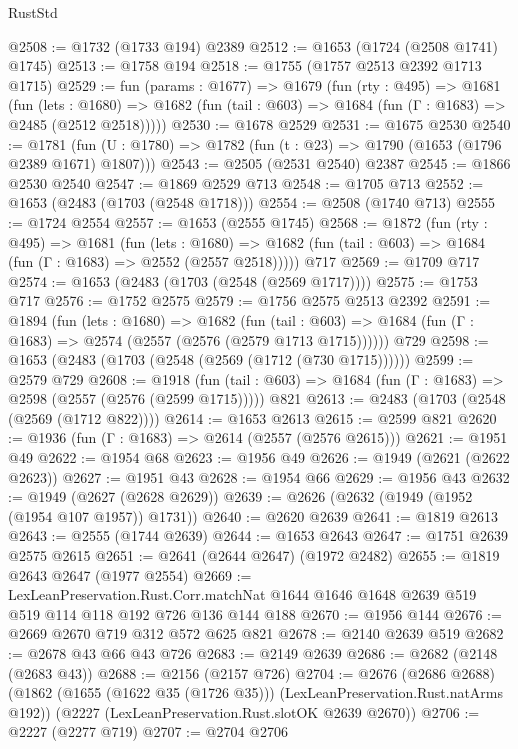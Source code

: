 \begin{lexlean}{RustStd}
\begin{coremodule}
@2508 := @1732 (@1733 @194) @2389
@2512 := @1653 (@1724 (@2508 @1741) @1745)
@2513 := @1758 @194
@2518 := @1755 (@1757 @2513 @2392 @1713 @1715)
@2529 := fun (params : @1677) =>
  @1679
    (fun (rty : @495) =>
    @1681
      (fun (lets : @1680) =>
      @1682 (fun (tail : @603) => @1684 (fun (Γ : @1683) => @2485 (@2512 @2518)))))
@2530 := @1678 @2529
@2531 := @1675 @2530
@2540 := @1781 (fun (U : @1780) => @1782 (fun (t : @23) => @1790 (@1653 (@1796 @2389 @1671) @1807)))
@2543 := @2505 (@2531 @2540) @2387
@2545 := @1866 @2530 @2540
@2547 := @1869 @2529 @713
@2548 := @1705 @713
@2552 := @1653 (@2483 (@1703 (@2548 @1718)))
@2554 := @2508 (@1740 @713)
@2555 := @1724 @2554
@2557 := @1653 (@2555 @1745)
@2568 := @1872
    (fun (rty : @495) =>
    @1681
      (fun (lets : @1680) =>
      @1682 (fun (tail : @603) => @1684 (fun (Γ : @1683) => @2552 (@2557 @2518)))))
    @717
@2569 := @1709 @717
@2574 := @1653 (@2483 (@1703 (@2548 (@2569 @1717))))
@2575 := @1753 @717
@2576 := @1752 @2575
@2579 := @1756 @2575 @2513 @2392
@2591 := @1894
    (fun (lets : @1680) =>
    @1682
      (fun (tail : @603) => @1684 (fun (Γ : @1683) => @2574 (@2557 (@2576 (@2579 @1713 @1715))))))
    @729
@2598 := @1653 (@2483 (@1703 (@2548 (@2569 (@1712 (@730 @1715))))))
@2599 := @2579 @729
@2608 := @1918
    (fun (tail : @603) => @1684 (fun (Γ : @1683) => @2598 (@2557 (@2576 (@2599 @1715)))))
    @821
@2613 := @2483 (@1703 (@2548 (@2569 (@1712 @822))))
@2614 := @1653 @2613
@2615 := @2599 @821
@2620 := @1936 (fun (Γ : @1683) => @2614 (@2557 (@2576 @2615)))
@2621 := @1951 @49
@2622 := @1954 @68
@2623 := @1956 @49
@2626 := @1949 (@2621 (@2622 @2623))
@2627 := @1951 @43
@2628 := @1954 @66
@2629 := @1956 @43
@2632 := @1949 (@2627 (@2628 @2629))
@2639 := @2626 (@2632 (@1949 (@1952 (@1954 @107 @1957)) @1731))
@2640 := @2620 @2639
@2641 := @1819 @2613
@2643 := @2555 (@1744 @2639)
@2644 := @1653 @2643
@2647 := @1751 @2639 @2575 @2615
@2651 := @2641 (@2644 @2647) (@1972 @2482)
@2655 := @1819 @2643 @2647 (@1977 @2554)
@2669 := LexLeanPreservation.Rust.Corr.matchNat
    @1644
    @1646
    @1648
    @2639
    @519
    @519
    @114
    @118
    @192
    @726
    @136
    @144
    @188
@2670 := @1956 @144
@2676 := @2669 @2670 @719 @312 @572 @625 @821
@2678 := @2140 @2639 @519
@2682 := @2678 @43 @66 @43 @726
@2683 := @2149 @2639
@2686 := @2682 (@2148 (@2683 @43))
@2688 := @2156 (@2157 @726)
@2704 := @2676
    (@2686 @2688)
    (@1862 (@1655 (@1622 @35 (@1726 @35))) (LexLeanPreservation.Rust.natArms @192))
    (@2227 (LexLeanPreservation.Rust.slotOK @2639 @2670))
@2706 := @2227 (@2277 @719)
@2707 := @2704 @2706

\end{coremodule}
\end{lexlean}
